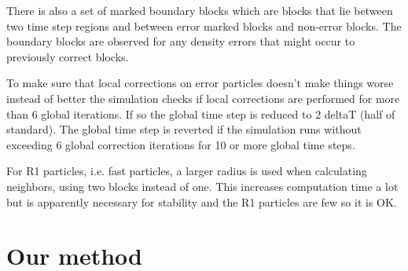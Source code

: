 \documentclass[../../main.tex]{subfiles}
\begin{document}
There is also a set of marked boundary blocks which are blocks that lie between two time step regions and between error marked blocks and non-error blocks. The boundary blocks are observed for any density errors that might occur to previously correct blocks. 

To make sure that local corrections on error particles doesn't make things worse instead of better the simulation checks if local corrections are performed for more than 6 global iterations. If so the global time step is reduced to 2 deltaT (half of standard). The global time step is reverted if the simulation runs without exceeding 6 global correction iterations for 10 or more global time steps. 

For R1 particles, i.e. fast particles, a larger radius is used when calculating neighbors, using two blocks instead of one. This increases computation time a lot but is apparently necessary for stability and the R1 particles are few so it is OK. 



\section{Our method}
\end{document}
